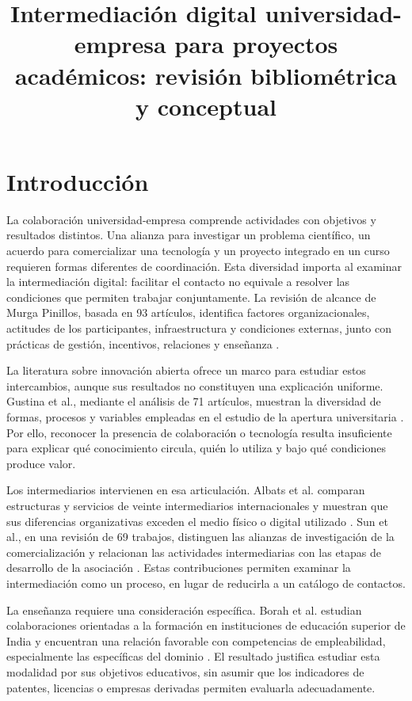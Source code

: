 \documentclass[12pt,twocolumn]{article}
\title{Intermediación digital universidad-empresa para proyectos académicos: revisión bibliométrica y conceptual}
\begin{document}
\makeingenioheader

\section{Introducción}
La colaboración universidad-empresa comprende actividades con objetivos y resultados distintos. Una alianza para investigar un problema científico, un acuerdo para comercializar una tecnología y un proyecto integrado en un curso requieren formas diferentes de coordinación. Esta diversidad importa al examinar la intermediación digital: facilitar el contacto no equivale a resolver las condiciones que permiten trabajar conjuntamente. La revisión de alcance de Murga Pinillos, basada en 93 artículos, identifica factores organizacionales, actitudes de los participantes, infraestructura y condiciones externas, junto con prácticas de gestión, incentivos, relaciones y enseñanza \cite{murga2024}.

La literatura sobre innovación abierta ofrece un marco para estudiar estos intercambios, aunque sus resultados no constituyen una explicación uniforme. Gustina et al., mediante el análisis de 71 artículos, muestran la diversidad de formas, procesos y variables empleadas en el estudio de la apertura universitaria \cite{gustina2024}. Por ello, reconocer la presencia de colaboración o tecnología resulta insuficiente para explicar qué conocimiento circula, quién lo utiliza y bajo qué condiciones produce valor.

Los intermediarios intervienen en esa articulación. Albats et al. comparan estructuras y servicios de veinte intermediarios internacionales y muestran que sus diferencias organizativas exceden el medio físico o digital utilizado \cite{albats2022}. Sun et al., en una revisión de 69 trabajos, distinguen las alianzas de investigación de la comercialización y relacionan las actividades intermediarias con las etapas de desarrollo de la asociación \cite{sun2025}. Estas contribuciones permiten examinar la intermediación como un proceso, en lugar de reducirla a un catálogo de contactos.

La enseñanza requiere una consideración específica. Borah et al. estudian colaboraciones orientadas a la formación en instituciones de educación superior de India y encuentran una relación favorable con competencias de empleabilidad, especialmente las específicas del dominio \cite{borah2021}. El resultado justifica estudiar esta modalidad por sus objetivos educativos, sin asumir que los indicadores de patentes, licencias o empresas derivadas permiten evaluarla adecuadamente.
\end{document}
